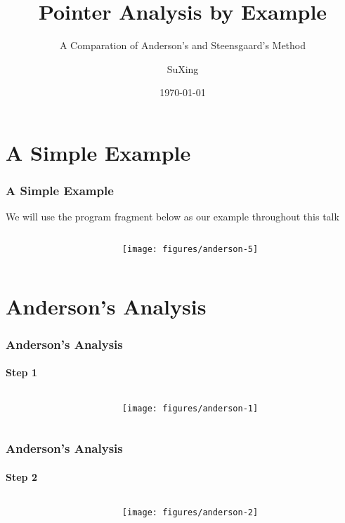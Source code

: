 \documentclass[]{beamer}
\title{Pointer Analysis by Example}
\subtitle{A Comparation of Anderson's and Steensgaard's Method}
\author[SuXing~pysuxing@gmail.com]{SuXing}
\institute{TOW}
\date{\today}
\begin{document}
\setlength{\parindent}{0pt}

\frame{\titlepage}
\frame{\tableofcontents}

\section{A Simple Example}
\frame{\tableofcontents[currentsection]}

\begin{frame}
  \frametitle{A Simple Example}
  We will use the program fragment below as our example throughout
  this talk
  \pause\vspace{1em}
  \begin{columns}
    \begin{column}{.4\textwidth}
      
    \end{column}
    \begin{column}{.6\textwidth}
      \texttt{[image: figures/anderson-5]}
    \end{column}
  \end{columns}
\end{frame}

\section{Anderson's Analysis}
\frame{\tableofcontents[currentsection]}

\begin{frame}
  \frametitle{Anderson's Analysis}
  \framesubtitle{Step 1}
  \begin{columns}
    \begin{column}{.4\textwidth}
      
      
    \end{column}
    \begin{column}{.6\textwidth}
      \texttt{[image: figures/anderson-1]}
    \end{column}
  \end{columns}
\end{frame}

\begin{frame}
  \frametitle{Anderson's Analysis}
  \framesubtitle{Step 2}
  \begin{columns}
    \begin{column}{.4\textwidth}
      
      
    \end{column}
    \begin{column}{.6\textwidth}
      \texttt{[image: figures/anderson-2]}
    \end{column}
  \end{columns}
\end{frame}
\end{document}
